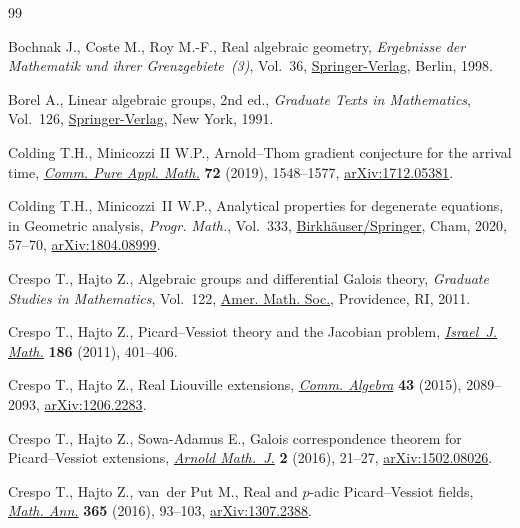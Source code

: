 \documentclass[pdftex]{sigma}%
\numberwithin{equation}{section}
\begin{document}
\begin{thebibliography}{99}
\footnotesize\itemsep=0pt

Bochnak J., Coste M., Roy M.-F., Real algebraic geometry, \textit{Ergebnisse der
 Mathematik und ihrer Grenzgebiete~(3)}, Vol.~36, \href{https://doi.org/10.1007/978-3-662-03718-8}{Springer-Verlag}, Berlin,
 1998.

Borel A., Linear algebraic groups, 2nd ed., \textit{Graduate Texts in Mathematics}, Vol.~126, \href{https://doi.org/10.1007/978-1-4612-0941-6}{Springer-Verlag}, New York, 1991.

Colding T.H., Minicozzi II W.P., Arnold--{T}hom gradient conjecture for the
 arrival time, \href{https://doi.org/10.1002/cpa.21824}{\textit{Comm. Pure Appl. Math.}} \textbf{72} (2019), 1548--1577,
 \href{https://arxiv.org/abs/1712.05381}{arXiv:1712.05381}.

Colding T.H., Minicozzi~II W.P., Analytical properties for degenerate
 equations, in Geometric analysis, \textit{Progr. Math.}, Vol.~333,
 \href{https://doi.org/10.1007/978-3-030-34953-0_4}{Birkh\"auser/Springer}, Cham, 2020, 57--70, \href{https://arxiv.org/abs/1804.08999}{arXiv:1804.08999}.

Crespo T., Hajto Z., Algebraic groups and differential {G}alois theory,
 \textit{Graduate Studies in Mathematics}, Vol.~122, \href{https://doi.org/10.1090/gsm/122}{Amer. Math. Soc.},
 Providence, RI, 2011.

Crespo T., Hajto Z., Picard--{V}essiot theory and the {J}acobian problem,
 \href{https://doi.org/10.1007/s11856-011-0145-y}{\textit{Israel~J. Math.}} \textbf{186} (2011), 401--406.

Crespo T., Hajto Z., Real {L}iouville extensions, \href{https://doi.org/10.1080/00927872.2014.888561}{\textit{Comm. Algebra}}
 \textbf{43} (2015), 2089--2093, \href{https://arxiv.org/abs/1206.2283}{arXiv:1206.2283}.

Crespo T., Hajto Z., Sowa-Adamus E., Galois correspondence theorem for
 {P}icard--{V}essiot extensions, \href{https://doi.org/10.1007/s40598-015-0029-z}{\textit{Arnold Math.~J.}} \textbf{2} (2016),
 21--27, \href{https://arxiv.org/abs/1502.08026}{arXiv:1502.08026}.

Crespo T., Hajto Z., van~der Put M., Real and {$p$}-adic {P}icard--{V}essiot
 fields, \href{https://doi.org/10.1007/s00208-015-1272-2}{\textit{Math. Ann.}} \textbf{365} (2016), 93--103, \href{https://arxiv.org/abs/1307.2388}{arXiv:1307.2388}.


\end{thebibliography}
\end{document}
